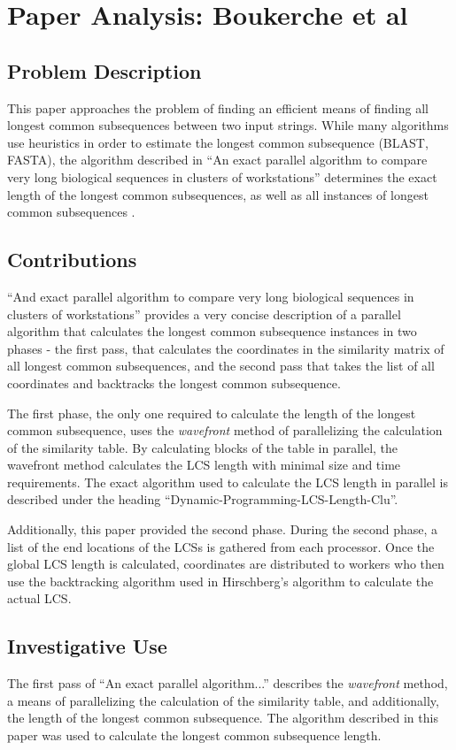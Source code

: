 \section{Paper Analysis: Boukerche et al }

\subsection{Problem Description}
This paper approaches the problem of finding an efficient means of
finding all longest common subsequences between two input
strings. While many algorithms use heuristics in order to estimate the
longest common subsequence (BLAST, FASTA), the algorithm described in
``An exact parallel algorithm to compare very long biological
sequences in clusters of workstations'' determines the exact length of
the longest common subsequences, as well as all instances of longest
common subsequences \cite{Boukerche:2007p1627}. 

\subsection{Contributions}
``And exact parallel algorithm to compare very long biological
sequences in clusters of workstations'' provides a very concise
description of a parallel algorithm that calculates the longest common
subsequence instances in two phases - the first pass, that calculates
the coordinates in the similarity matrix of all longest common
subsequences, and the second pass that takes the list of all
coordinates and backtracks the longest common subsequence.

The first phase, the only one required to calculate the length of the
longest common subsequence, uses the \textit{wavefront} method of
parallelizing the calculation of the similarity table. By calculating
blocks of the table in parallel, the wavefront method calculates the
LCS length with minimal size and time requirements. The exact
algorithm used to calculate the LCS length in parallel is described
under the heading ``Dynamic-Programming-LCS-Length-Clu''.

Additionally, this paper provided the second phase. During the second
phase, a list of the end locations of the LCSs is gathered from each
processor. Once the global LCS length is calculated, coordinates are
distributed to workers who then use the backtracking algorithm used in
Hirschberg's algorithm to calculate the actual LCS.

\subsection{Investigative Use}
The first pass of ``An exact parallel algorithm...'' describes the
\textit{wavefront} method, a means of parallelizing the calculation of
the similarity table, and additionally, the length of the longest
common subsequence. The algorithm described in this paper was used to
calculate the longest common subsequence length.
